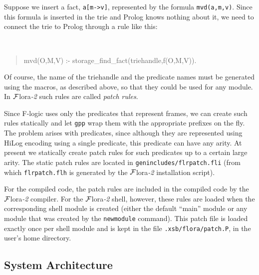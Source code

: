 \documentclass[11pt]{article}
\newcommand{\FLORA}{{\mbox{\sc ${\cal F}${lora}\rm\emph{-2}}}\xspace}
\newcommand{\FLSYSTEM}{\FLORA}
\newcommand{\fl}{\mbox{F-logic}\xspace}
\begin{document}
{Suppose we insert a fact, {\tt a[m->v]}, represented by the formula
{\tt mvd(a,m,v)}. Since this formula is inserted in the trie and Prolog knows
nothing about it, we need to connect the trie to Prolog through a rule like
this:
{\tt
\begin{quote}
  mvd(O,M,V) :- storage\_find\_fact(triehandle,f(O,M,V)).
\end{quote}
}
Of course, the name of the triehandle and the predicate names must be
generated using the macros, as described above, so that they could be used
for any module. In \FLSYSTEM such rules are called \emph{patch rules}. 

Since \fl uses only the predicates that represent frames, we can
create such rules statically and let {\tt gpp} wrap them with the
appropriate prefixes on the fly.  The problem arises with predicates, since
although they are represented using HiLog encoding using a single
predicate, this predicate can have any arity.  At present we statically
create patch rules for such predicates up to a certain large arity.  The
static patch rules are located in {\tt genincludes/flrpatch.fli} (from
which {\tt flrpatch.flh} is generated by the \FLSYSTEM installation script).

For the compiled code, the patch rules are included in the compiled code
by the \FLSYSTEM compiler. For the \FLSYSTEM shell, however, these rules are
loaded when the corresponding shell module is created (either the default
``main'' module or any module that was created by the {\tt newmodule}
command). This patch file is loaded exactly once per shell module and is
kept in the file {\tt .xsb/flora/patch.P}, in the user's home directory.


\subsection{System Architecture}

}
\end{document}
